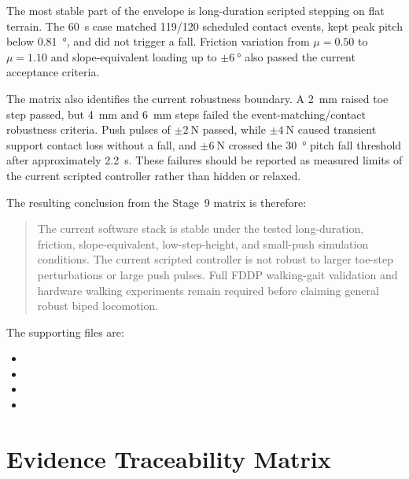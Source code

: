 \documentclass[12pt,a4paper]{report}
\begin{document}
The most stable part of the envelope is long-duration scripted stepping on flat terrain. The \SI{60}{\second} case matched 119/120 scheduled contact events, kept peak pitch below \SI{0.81}{\degree}, and did not trigger a fall. Friction variation from $\mu=0.50$ to $\mu=1.10$ and slope-equivalent loading up to $\pm\SI{6}{\degree}$ also passed the current acceptance criteria.
 
The matrix also identifies the current robustness boundary. A \SI{2}{\milli\metre} raised toe step passed, but \SI{4}{\milli\metre} and \SI{6}{\milli\metre} steps failed the event-matching/contact robustness criteria. Push pulses of $\pm\SI{2}{\newton}$ passed, while $\pm\SI{4}{\newton}$ caused transient support contact loss without a fall, and $\pm\SI{6}{\newton}$ crossed the \SI{30}{\degree} pitch fall threshold after approximately \SI{2.2}{\second}. These failures should be reported as measured limits of the current scripted controller rather than hidden or relaxed.
 
The resulting conclusion from the Stage~9 matrix is therefore:
\begin{quote}
The current software stack is stable under the tested long-duration, friction, slope-equivalent, low-step-height, and small-push simulation conditions. The current scripted controller is not robust to larger toe-step perturbations or large push pulses. Full FDDP walking-gait validation and hardware walking experiments remain required before claiming general robust biped locomotion.
\end{quote}
 
The supporting files are:
\begin{itemize}
    \item {}
    \item {}
    \item {}
    \item {}
\end{itemize}
 
\section{Evidence Traceability Matrix}\label{sec:evidence_traceability}
 
\end{document}
